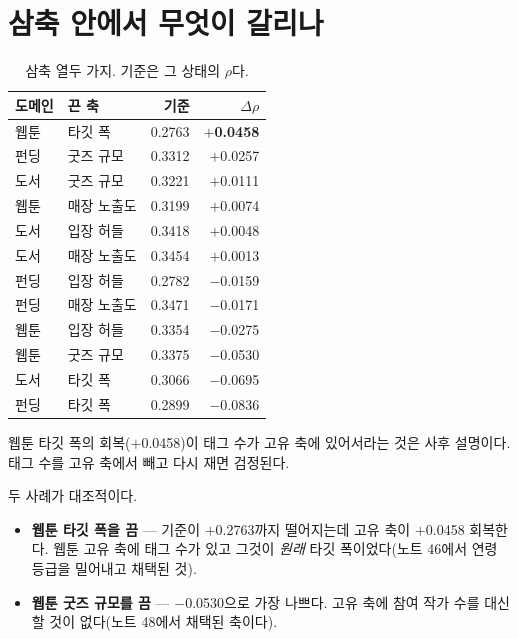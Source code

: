 \documentclass[10pt]{article}
\begin{document}

\section{삼축 안에서 무엇이 갈리나}

\begin{table}[t]
\centering\tsize
\caption{삼축 열두 가지. 기준은 그 상태의 $\rho$다.}
\begin{tabular}{llrr}
\toprule
도메인 & 끈 축 & 기준 & $\Delta\rho$ \\
\midrule
웹툰 & 타깃 폭 & 0.2763 & \textbf{$+$0.0458} \\
펀딩 & 굿즈 규모 & 0.3312 & $+$0.0257 \\
도서 & 굿즈 규모 & 0.3221 & $+$0.0111 \\
웹툰 & 매장 노출도 & 0.3199 & $+$0.0074 \\
도서 & 입장 허들 & 0.3418 & $+$0.0048 \\
도서 & 매장 노출도 & 0.3454 & $+$0.0013 \\
\midrule
펀딩 & 입장 허들 & 0.2782 & $-$0.0159 \\
펀딩 & 매장 노출도 & 0.3471 & $-$0.0171 \\
웹툰 & 입장 허들 & 0.3354 & $-$0.0275 \\
웹툰 & 굿즈 규모 & 0.3375 & $-$0.0530 \\
도서 & 타깃 폭 & 0.3066 & $-$0.0695 \\
펀딩 & 타깃 폭 & 0.2899 & $-$0.0836 \\
\bottomrule
\end{tabular}
\end{table}

{웹툰 타깃 폭의 회복($+$0.0458)이 태그 수가 고유 축에 있어서라는 것은 사후
설명이다. 태그 수를 고유 축에서 빼고 다시 재면 검정된다.}

두 사례가 대조적이다.

\begin{itemize}[leftmargin=1.1em,itemsep=0.15em]
\item \textbf{웹툰 타깃 폭을 끔} --- 기준이 $+$0.2763까지 떨어지는데 고유 축이
      $+$0.0458 회복한다. 웹툰 고유 축에 태그 수가 있고 그것이 \emph{원래}
      타깃 폭이었다(노트 46에서 연령 등급을 밀어내고 채택된 것).
\item \textbf{웹툰 굿즈 규모를 끔} --- $-$0.0530으로 가장 나쁘다. 고유 축에
      참여 작가 수를 대신할 것이 없다(노트 48에서 채택된 축이다).
\end{itemize}
\end{document}
